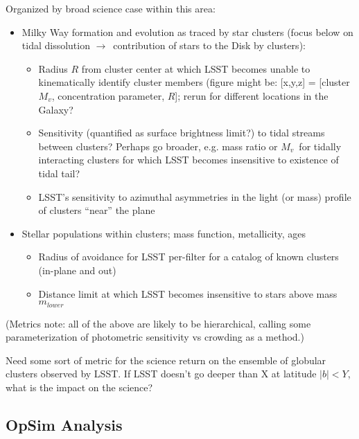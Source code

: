 Organized by broad science case within this area:
\begin{itemize}
\item Milky Way formation and evolution as traced by star clusters (focus below on tidal dissolution $\rightarrow$~contribution of stars to the Disk by clusters):
  \begin{itemize}
    \item Radius $R$ from cluster center at which LSST becomes unable to kinematically identify cluster members (figure might be: [x,y,z] = [cluster $M_v$, concentration parameter, $R$]; rerun for different locations in the Galaxy?
      \item Sensitivity (quantified as surface brightness limit?) to tidal streams between clusters? Perhaps go broader, e.g. mass ratio or $M_v$~for tidally interacting clusters for which LSST becomes insensitive to existence of tidal tail?
        \item LSST's sensitivity to azimuthal asymmetries in the light (or mass) profile of clusters ``near'' the plane
  \end{itemize} 

\item Stellar populations within clusters; mass function, metallicity, ages
  \begin{itemize}
    \item Radius of avoidance for LSST per-filter for a catalog of
      known clusters (in-plane and out)
      \item Distance limit at which LSST becomes insensitive to stars above mass $m_{lower}$ 
  \end{itemize}

\end{itemize}

(Metrics note: all of the above are likely to be hierarchical, calling
some parameterization of photometric sensitivity vs crowding as a
method.)

Need some sort of metric for the science return on the ensemble of
globular clusters observed by LSST. If LSST doesn't go deeper than X
at latitude $|b| < Y$, what is the impact on the science?



\subsection{OpSim Analysis}
\label{sec:keyword:analysis}

